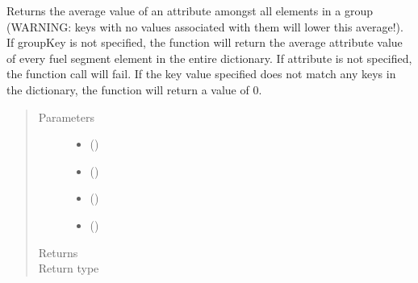 \documentclass[letterpaper,10pt,openany,oneside,english]{sphinxmanual}
\begin{document}
\begin{fulllineitems}
\begin{fulllineitems}
\label{\detokenize{support_rst/fuelsegmentsgroups:fuelsegmentsgroups.FuelSegmentsGroups.GetAttribute}}
Returns the average value of an attribute amongst all elements in a
group (WARNING: keys with no values associated with them will lower
this average!). If groupKey is not specified, the function will return
the average attribute value of every fuel segment element in the
entire dictionary. If attribute is not specified, the function call
will fail. If the key value specified does not match any keys in the
dictionary, the function will return a value of 0.
\begin{quote}\begin{description}
\item[{Parameters}] \leavevmode\begin{itemize}
\item {} 
 () \textendash{} 

\item {} 
 () \textendash{} 

\item {} 
 () \textendash{} 

\item {} 
 () \textendash{} 

\end{itemize}

\item[{Returns}] \leavevmode
{}

\item[{Return type}] \leavevmode
{}


\end{description}
\end{quote}
\end{fulllineitems}
\end{fulllineitems}
\end{document}
